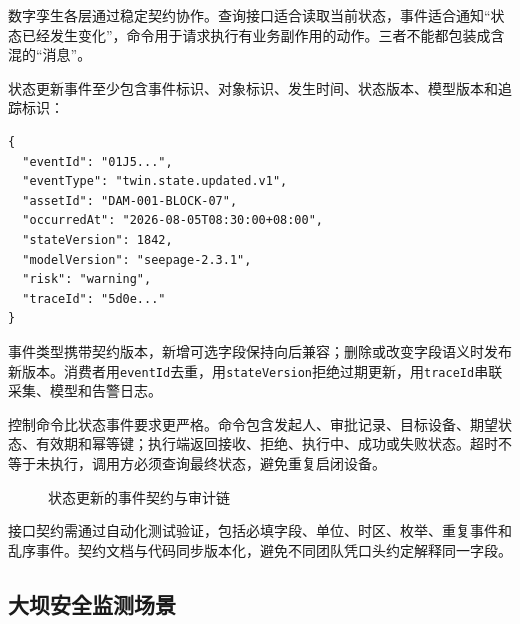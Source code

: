 数字孪生各层通过稳定契约协作。查询接口适合读取当前状态，事件适合通知“状态已经发生变化”，命令用于请求执行有业务副作用的动作。三者不能都包装成含混的“消息”。

状态更新事件至少包含事件标识、对象标识、发生时间、状态版本、模型版本和追踪标识：

\begin{lstlisting}
{
  "eventId": "01J5...",
  "eventType": "twin.state.updated.v1",
  "assetId": "DAM-001-BLOCK-07",
  "occurredAt": "2026-08-05T08:30:00+08:00",
  "stateVersion": 1842,
  "modelVersion": "seepage-2.3.1",
  "risk": "warning",
  "traceId": "5d0e..."
}
\end{lstlisting}

事件类型携带契约版本，新增可选字段保持向后兼容；删除或改变字段语义时发布新版本。消费者用\texttt{eventId}去重，用\texttt{stateVersion}拒绝过期更新，用\texttt{traceId}串联采集、模型和告警日志。

控制命令比状态事件要求更严格。命令包含发起人、审批记录、目标设备、期望状态、有效期和幂等键；执行端返回接收、拒绝、执行中、成功或失败状态。超时不等于未执行，调用方必须查询最终状态，避免重复启闭设备。

\begin{figure}[htbp]
\centering
{}
\caption{状态更新的事件契约与审计链}
\label{fig:dt-event-contract}
\end{figure}

接口契约需通过自动化测试验证，包括必填字段、单位、时区、枚举、重复事件和乱序事件。契约文档与代码同步版本化，避免不同团队凭口头约定解释同一字段。

\subsection{大坝安全监测场景}

